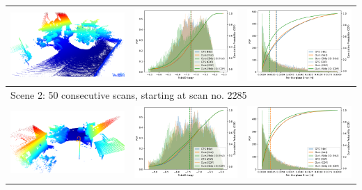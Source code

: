 \begin{table}[h]
{\begin{tabular}{ccc}
            \hline
            \includegraphics[width=0.3\linewidth]{images/map_eval/viz-2285--50.png}                    &
            \includegraphics[width=0.31\linewidth]{images/map_eval/entropy_gps_ours_skip-2285--50.pdf} &
            \includegraphics[width=0.31\linewidth]{images/map_eval/p2plane_gps_ours_skip-2285--50.pdf}                                                 \\
            \hline
            \multicolumn{3}{l}{Scene 2: 50 consecutive scans, starting at scan no. 2285}                                                               \\
            \hline
            \includegraphics[width=0.3\linewidth]{images/map_eval/viz-3000--50.png}                    &
            \includegraphics[width=0.31\linewidth]{images/map_eval/entropy_gps_ours_skip-3000--50.pdf} &
            \includegraphics[width=0.31\linewidth]{images/map_eval/p2plane_gps_ours_skip-3000--50.pdf}                                                 \\

\end{tabular}}
\end{table}
